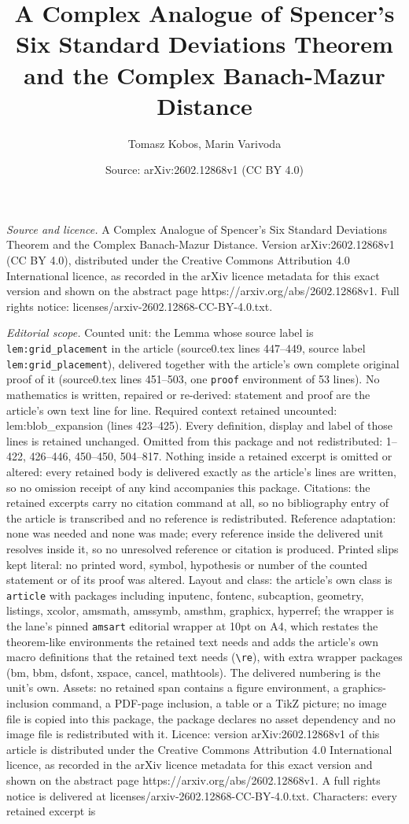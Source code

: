 \documentclass[10pt,a4paper]{amsart}
\title[A Complex Analogue of Spencer's Six Standard Deviations Theo]{A Complex Analogue of Spencer's Six Standard Deviations Theorem and the Complex Banach-Mazur Distance}
\author{Tomasz Kobos, Marin Varivoda}
\date{Source: arXiv:2602.12868v1 (CC BY 4.0)}
\begin{document}
\maketitle

\noindent\emph{Source and licence.} A Complex Analogue of Spencer's Six Standard Deviations Theorem and the Complex Banach-Mazur Distance. Version arXiv:2602.12868v1 (CC BY 4.0), distributed under the Creative Commons Attribution 4.0 International licence, as recorded in the arXiv licence metadata for this exact version and shown on the abstract page https://arxiv.org/abs/2602.12868v1. Full rights notice: licenses/arxiv-2602.12868-CC-BY-4.0.txt.\par\smallskip

\noindent\textit{Editorial scope.} Counted unit: the Lemma whose source label is \texttt{lem:grid\_placement} in the article (source0.tex lines 447--449, source label \texttt{lem:grid\_placement}), delivered together with the article's own complete original proof of it (source0.tex lines 451--503, one \texttt{proof} environment of 53 lines). No mathematics is written, repaired or re-derived: statement and proof are the article's own text line for line. Required context retained uncounted: lem:blob\_expansion (lines 423--425). Every definition, display and label of those lines is retained unchanged. Omitted from this package and not redistributed: 1--422, 426--446, 450--450, 504--817. Nothing inside a retained excerpt is omitted or altered: every retained body is delivered exactly as the article's lines are written, so no omission receipt of any kind accompanies this package. Citations: the retained excerpts carry no citation command at all, so no bibliography entry of the article is transcribed and no reference is redistributed. Reference adaptation: none was needed and none was made; every reference inside the delivered unit resolves inside it, so no unresolved reference or citation is produced. Printed slips kept literal: no printed word, symbol, hypothesis or number of the counted statement or of its proof was altered. Layout and class: the article's own class is \texttt{article} with packages including inputenc, fontenc, subcaption, geometry, listings, xcolor, amsmath, amssymb, amsthm, graphicx, hyperref; the wrapper is the lane's pinned \texttt{amsart} editorial wrapper at 10pt on A4, which restates the theorem-like environments the retained text needs and adds the article's own macro definitions that the retained text needs (\texttt{\textbackslash re}), with extra wrapper packages (bm, bbm, dsfont, xspace, cancel, mathtools). The delivered numbering is the unit's own. Assets: no retained span contains a figure environment, a graphics-inclusion command, a PDF-page inclusion, a table or a TikZ picture; no image file is copied into this package, the package declares no asset dependency and no image file is redistributed with it. Licence: version arXiv:2602.12868v1 of this article is distributed under the Creative Commons Attribution 4.0 International licence, as recorded in the arXiv licence metadata for this exact version and shown on the abstract page https://arxiv.org/abs/2602.12868v1. A full rights notice is delivered at licenses/arxiv-2602.12868-CC-BY-4.0.txt. Characters: every retained excerpt is 
\end{document}
